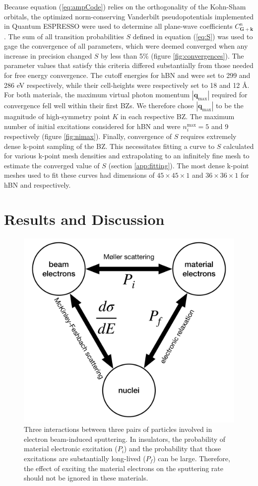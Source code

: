 \documentclass[twoside,twocolumn,9pt]{article}
\begin{document}
Because equation (\ref{eq:ampCode}) relies on the orthogonality of the
Kohn-Sham orbitals, the optimized norm-conserving Vanderbilt
pseudopotentials \cite{Hamann2013, Schlipf2015} implemented in Quantum
ESPRESSO \cite{Giannozzi2009} were used to determine all plane-wave coefficients
$C^n_\mathbf{G+k}$.
The sum of all transition probabilities $S$ defined in equation (\ref{eq:S})
was used to gage the convergence of all parameters, which were deemed converged
when any increase in precision changed $S$ by less than 5\% (figure
\ref{fig:convergences}).
The parameter values that satisfy this criteria differed substantially from
those needed for free energy convergence.
The cutoff energies for hBN and  were set to 299 and 286 eV
respectively, while their cell-heights were respectively set to 18 and 12
{\AA}.
For both materials, the maximum virtual photon momentum
$|\mathbf{q}_\text{max}|$ required for convergence fell well within their first
BZs.
We therefore chose $|\mathbf{q}_\text{max}|$ to be the magnitude of
high-symmetry point $K$ in each respective BZ.
The maximum number of initial excitations considered for hBN and  were
$n_i^\text{max} = 5$ and 9 respectively (figure \ref{fig:nimax}).
Finally, convergence of $S$ requires extremely dense k-point sampling of the
BZ.
This necessitates fitting a curve to $S$ calculated for various k-point mesh
densities and extrapolating to an infinitely fine mesh to estimate the
converged value of $S$ (section \ref{app:fitting}).
The most dense k-point meshes used to fit these curves had dimensions of
$45\times45\times1$ and $36\times36\times1$ for hBN and  respectively.

\section{Results and Discussion}
\label{sec:bigPicture}

\begin{figure}
  \centering
  \includegraphics[width=.45\textwidth]{figures/triad.pdf}
  \caption{
    Three interactions between three pairs of particles involved in electron
    beam-induced sputtering.
    In insulators, the probability of material electronic excitation ($P_i$)
    and the probability that those excitations are substantially long-lived
    ($P_f$) can be large.
    Therefore, the effect of exciting the material electrons on the sputtering
    rate should not be ignored in these materials.
  }
  \label{fig:triad}
\end{figure}
\end{document}

